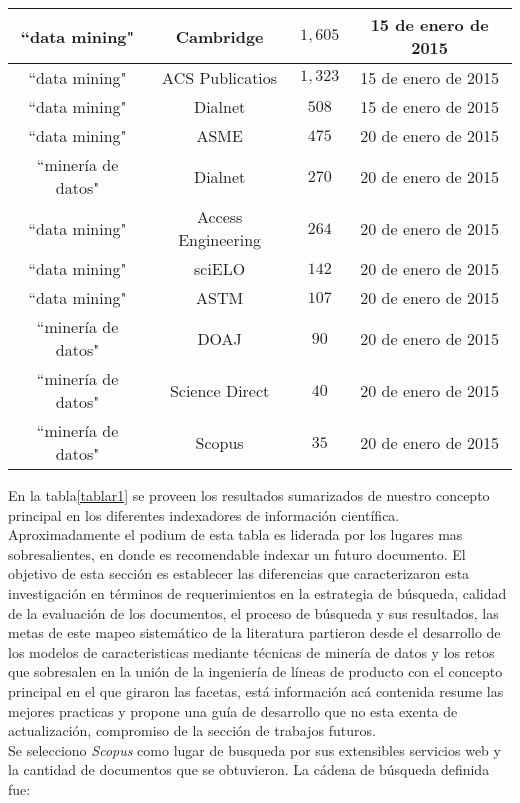 \begin{longtable}{|c|c|c|c|}
``data mining"      & Cambridge            & $1,605$   & 15 de enero de 2015 \tabularnewline \hline
``data mining"      & ACS Publicatios      &$ 1,323$   & 15 de enero de 2015 \tabularnewline \hline
``data mining"      & Dialnet              & $508$    & 15 de enero de 2015 \tabularnewline \hline
``data mining"      & ASME                 & $475$    & 20 de enero de 2015 \tabularnewline \hline
``minería de datos" & Dialnet              & $270$    & 20 de enero de 2015 \tabularnewline \hline
``data mining"      & Access Engineering  & $264$    & 20 de enero de 2015 \tabularnewline \hline
``data mining"      & sciELO               & $142$    & 20 de enero de 2015 \tabularnewline \hline
``data mining"      & ASTM                 & $107 $   & 20 de enero de 2015 \tabularnewline \hline
``minería de datos" & DOAJ                 & $90$     & 20 de enero de 2015 \tabularnewline \hline
``minería de datos" & Science Direct       & $40$     & 20 de enero de 2015 \tabularnewline \hline
``minería de datos" & Scopus               & $35$     & 20 de enero de 2015\tabularnewline \hline
\end{longtable}

En la tabla\ref{tablar1} se proveen los resultados sumarizados de nuestro concepto principal en los diferentes indexadores de información científica. Aproximadamente el podium de esta tabla es liderada por los lugares mas sobresalientes, en donde es recomendable indexar un futuro documento. El objetivo de esta sección es establecer las diferencias que caracterizaron esta investigación en términos de requerimientos en la estrategia de búsqueda, calidad de la evaluación de los documentos, el proceso de búsqueda y sus resultados, las metas de este mapeo sistemático de la literatura partieron desde el desarrollo de los modelos de caracteristicas mediante técnicas de minería de datos y los retos que sobresalen en la unión de la ingeniería de líneas de producto con el concepto principal en el que giraron las facetas, está información acá contenida resume las mejores practicas\cite{Petersen2015}  y propone una guía de desarrollo que no esta exenta de actualización, compromiso de la sección de trabajos futuros.\\
Se selecciono \textit{Scopus} como lugar de busqueda por sus extensibles servicios web y la cantidad de documentos que se obtuvieron. La cádena de búsqueda definida fue:


\newtheorem{defn}{Cadena de busqueda para Scopus}

